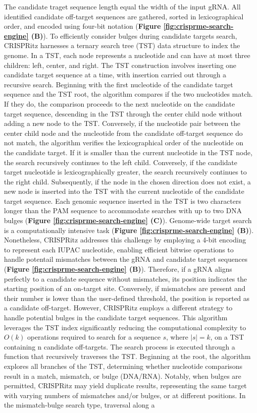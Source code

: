 \documentclass[a4paper, titlepage, openright]{book}
\begin{document}
The candidate traget sequence length equal the width of the input gRNA. All identified candidate off-target sequences are gathered, sorted in lexicographical order, and encoded using four-bit notation (\textbf{Figure \ref{fig:crisprme-search-engine} (B)}). To efficiently consider bulges during candidate targets search, CRISPRitz harnesses a ternary search tree (TST) data structure \citep{bentley1998ternary} to index the genome. In a TST, each node represents a nucleotide and can have at most three children: left, center, and right. The TST construction involves inserting one candidate target sequence at a time, with insertion carried out through a recursive search. Beginning with the first nucleotide of the candidate target sequence and the TST root, the algorithm compares if the two nucleotides match. If they do, the comparison proceeds to the next nucleotide on the candidate target sequence, descending in the TST through the center child node without adding a new node to the TST. Conversely, if the nucleotide pair between the center child node and the nucleotide from the candidate off-target sequence do not match, the algorithm verifies the lexicographical order of the nucleotide on the candidate target. If it is smaller than the current nucleotide in the TST node, the search recursively continues to the left child. Conversely, if the candidate target nucleotide is lexicographically greater, the search recursively continues to the right child. Subsequently, if the node in the chosen direction does not exist, a new node is inserted into the TST with the current nucleotide of the candidate target sequence. Each genomic sequence inserted in the TST is two characters longer than the PAM sequence to accommodate searches with up to two DNA bulges (\textbf{Figure \ref{fig:crisprme-search-engine} (C)}). Genome-wide target search is a computationally intensive task (\textbf{Figure \ref{fig:crisprme-search-engine} (B)}). Nonetheless, CRISPRitz addresses this challenge by employing a 4-bit encoding to represent each IUPAC nucleotide, enabling efficient bitwise operations to handle potentail mismatches between the gRNA and candidate target sequences (\textbf{Figure \ref{fig:crisprme-search-engine} (B)}). Therefore, if a gRNA aligns perfectly to a candidate sequence without mismatches, its position indicates the starting position of an on-target site. Conversely, if mismatches are present and their number is lower than the user-defined threshold, the position is reported as a candidate off-target. However, CRISPRitz employs a different strategy to handle potential bulges in the candidate target sequences. This algorithm leverages the TST index significantly reducing the computational complexity to $O(k)$ operations required to search for a sequence $s$, where $|s|=k$, on a TST containing n candidate off-targets. The search process is executed through a function that recursively traverses the TST. Beginning at the root, the algorithm explores all branches of the TST, determining whether nucleotide comparisons result in a match, mismatch, or bulge (DNA/RNA). Notably, when bulges are permitted, CRISPRitz may yield duplicate results, representing the same target with varying numbers of mismatches and/or bulges, or at different positions. In the mismatch-bulge search type, traversal along a 
\end{document}
